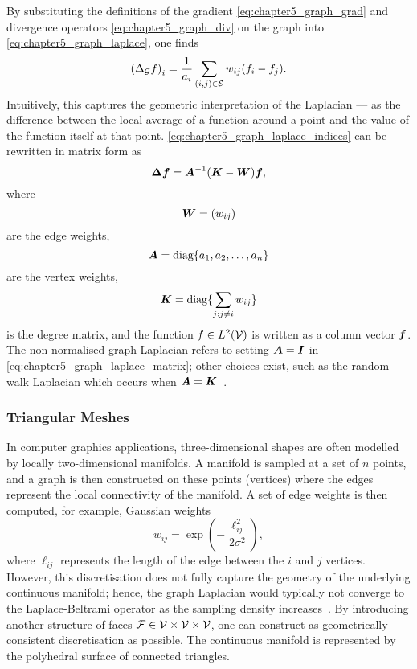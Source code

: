 By substituting the definitions of the gradient \cref{eq:chapter5_graph_grad} and divergence operators \cref{eq:chapter5_graph_div} on the graph into \cref{eq:chapter5_graph_laplace}, one finds
%
\begin{equation}\label{eq:chapter5_graph_laplace_indices}
	{(\Delta_{\mathcal{G}} f)}_{i}
	= \frac{1}{a_{i}} \sum\limits_{(i,j) \in \mathcal{E}} w_{i j} (f_{i} - f_{j}).
\end{equation}
%
Intuitively, this captures the geometric interpretation of the Laplacian --- as the difference between the local average of a function around a point and the value of the function itself at that point.
\cref{eq:chapter5_graph_laplace_indices} can be rewritten in matrix form as
%
\begin{equation}\label{eq:chapter5_graph_laplace_matrix}
	\vb*{\Delta} \vb*{f}
	= \vb*{A}^{-1} (\vb*{K} - \vb*{W}) \vb*{f},
\end{equation}
%
where
%
\begin{equation}
	\vb*{W}
	= (w_{i j})
\end{equation}
%
are the edge weights,
%
\begin{equation}
	\vb*{A}
	= \text{diag}\{a_{1},a_{2},\ldots,a_{n}\}
\end{equation}
%
are the vertex weights,
%
\begin{equation}
	\vb*{K}
	= \text{diag}\{\sum\limits_{j: j \neq i} w_{i j}\}
\end{equation}
%
is the degree matrix, and the function \(f \in L^{2}(\mathcal{V})\) is written as a column vector \(\vb*{f}\).
The non-normalised graph Laplacian refers to setting \(\vb*{A} = \vb*{I}\) in \cref{eq:chapter5_graph_laplace_matrix}; other choices exist, such as the random walk Laplacian which occurs when \(\vb*{A} = \vb*{K}\)~\cite{VonLuxburg2007}.

\subsubsection{Triangular Meshes}

In computer graphics applications, three-dimensional shapes are often modelled by locally two-dimensional manifolds.
A manifold is sampled at a set of \(n\) points, and a graph is then constructed on these points (vertices) where the edges represent the local connectivity of the manifold.
A set of edge weights is then computed, for example, Gaussian weights
%
\begin{equation}
	w_{i j}
	= \exp(-\frac{\ell_{i j}^{2}}{2\sigma^{2}}),
\end{equation}
%
where \(\ell_{i j}\) represents the length of the edge between the \(i\) and \(j\) vertices.
However, this discretisation does not fully capture the geometry of the underlying continuous manifold; hence, the graph Laplacian would typically not converge to the Laplace-Beltrami operator as the sampling density increases~\cite{Bronstein2017,Wardetzky2007}.
By introducing another structure of faces \(\mathcal{F} \in \mathcal{V} \times \mathcal{V} \times \mathcal{V}{}\), one can construct as geometrically consistent discretisation as possible.
The continuous manifold is represented by the polyhedral surface of connected triangles.

